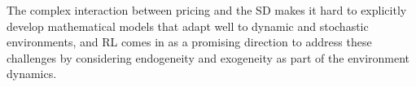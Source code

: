 \documentclass{article}
\begin{document}
The complex interaction between pricing and the SD makes it hard to explicitly develop mathematical models that adapt well to dynamic and stochastic environments, and RL comes in as a promising direction to address these challenges by considering endogeneity and exogeneity as part of the environment dynamics.

\end{document}
